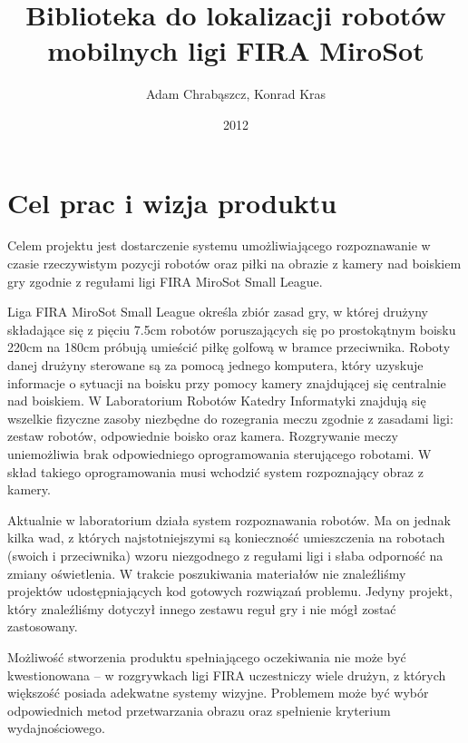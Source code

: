 \documentclass[polish,12pt]{aghthesis}
\author{Adam Chrabąszcz, Konrad Kras}
\title{Biblioteka do lokalizacji robotów mobilnych ligi FIRA MiroSot}
\date{2012}
\begin{document}
\maketitle



\section{Cel prac i wizja produktu}
\label{sec:cel-wizja}
Celem projektu jest
dostarczenie systemu umożliwiającego rozpoznawanie w czasie rzeczywistym
pozycji robotów oraz piłki na obrazie z kamery nad boiskiem gry zgodnie z
regułami ligi FIRA MiroSot Small League.

Liga FIRA MiroSot Small League określa zbiór zasad gry, w której drużyny
składające się z pięciu 7.5cm robotów poruszających się po prostokątnym boisku
220cm na 180cm próbują umieścić piłkę golfową w bramce przeciwnika. Roboty danej
drużyny sterowane są za pomocą jednego komputera, który uzyskuje informacje
o sytuacji na boisku przy pomocy kamery znajdującej się centralnie nad boiskiem.
W Laboratorium Robotów Katedry Informatyki znajdują się wszelkie fizyczne zasoby
niezbędne do rozegrania meczu zgodnie z zasadami ligi: zestaw robotów, 
odpowiednie boisko oraz kamera. Rozgrywanie meczy uniemożliwia brak 
odpowiedniego oprogramowania sterującego robotami. W skład takiego 
oprogramowania musi wchodzić system rozpoznający obraz z kamery. 

Aktualnie w laboratorium działa system rozpoznawania robotów. Ma on jednak kilka
wad, z których najstotniejszymi są konieczność umieszczenia na robotach
(swoich i przeciwnika) wzoru niezgodnego z regułami ligi
i słaba odporność na zmiany oświetlenia.
W trakcie poszukiwania materiałów nie znaleźliśmy projektów udostępniających
kod gotowych rozwiązań problemu. Jedyny projekt, który znaleźliśmy dotyczył
innego zestawu reguł gry i nie mógł zostać zastosowany. 

Możliwość stworzenia produktu spełniającego oczekiwania nie może być
kwestionowana -- w rozgrywkach ligi FIRA uczestniczy wiele drużyn, z których
większość posiada adekwatne systemy wizyjne. Problemem może być wybór
odpowiednich metod przetwarzania obrazu oraz spełnienie kryterium
wydajnościowego.
\end{document}
